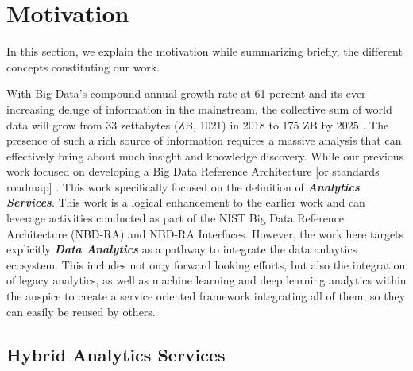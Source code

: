 


\section{Motivation}\label{s:background}

In this section, we explain the motivation  while summarizing
briefly, the different concepts constituting our work.

With Big Data's compound annual growth rate at 61 percent and its
ever-increasing deluge of information in the mainstream, the
collective sum of world data will grow from 33 zettabytes (ZB, 1021)
in 2018 to 175 ZB by 2025 . The presence of such a rich source of
information requires a massive analysis that can effectively bring
about much insight and knowledge discovery. While our previous work
focused on developing a Big Data Reference
Architecture [or standards roadmap] \cite{??}. This work specifically focused on the
definition of {\bf\em Analytics Services}.  This work is a logical
enhancement to the earlier work and can leverage activities conducted
as part of the NIST Big Data Reference Architecture (NBD-RA) and
NBD-RA Interfaces.  However, the work here targets explicitly {\bf\em
Data Analytics} as a pathway to integrate the data anlaytics ecosystem. This includes not on;y forward looking efforts, but also the integration of legacy analytics,
as well as machine learning and deep learning analytics within the auspice to
create a service oriented framework integrating all of them, so they can easily be reused by others.



\subsection{Hybrid Analytics Services}


